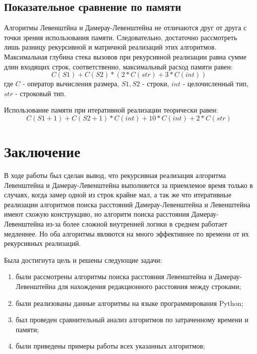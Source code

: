 \documentclass[a4paper]{article}
\begin{document}
	\subsection{Показательное сравнение по памяти}
	Алгоритмы Левенштйна и Дамерау-Левенштейна не отличаются друг от друга с точки зрения использования памяти. Следовательно, достаточно рассмотреть лишь разницу рекурсивной и матричной реализаций этих алгоритмов. Максимальная глубина стека вызовов при рекурсивной реализации равна сумме длин входящих строк, соответственно, максимальный расход памяти равен:
	\begin{equation}
	C(S1) + C(S2) * (2 * C(str) + 3*C(int))
	\end{equation}
	\label{pamyat1}	
	где $C$ - оператор вычисления размера, $S1, S2$ - строки, $int$ - целочисленный тип, $str$ - строковый тип.
	
	Использование памяти при итеративной реализации теорически равен:
	\begin{equation}
		C(S1+1) + C(S2+1) * C(int) + 10*C(int) + 2*C(str)
		\label{pamyat2}
	\end{equation}
	\clearpage
	\section*{Заключение} В ходе работы был сделан вывод, что рекурсивная реализация алгоритма Левенштейна и Дамерау-Левенштейна выполняется за приемлемое время только в случаях, когда замер одной из строк крайне мал, а так же что итеративные реализации алгоритмов поиска расстояний Дамерау-Левенштейна и Левенштейна имеют схожую конструкцию, но алгоритм поиска расстояния Дамерау-Левенштейна из-за более сложной внутренней логики в среднем работает медленнее. Но оба алгоритмы являются на много эффективнее по времени от их рекурсивных реализаций.
	
	Была достигнута цель и решены следующие задачи:
	\begin{enumerate}
		\item были рассмотрены алгоритмы поиска расстояния Левенштейна и Дамерау-Левенштейна для нахождения редакционного расстояния между строками;
		\item были реализованы данные алгоритмы на языке программирования Python;
		\item был проведен сравнительный анализ алгоритмов по затраченному времени и памяти;
		\item были приведены примеры работы всех указанных алгоритмов;
	\end{enumerate}
	\clearpage
	
\end{document}

